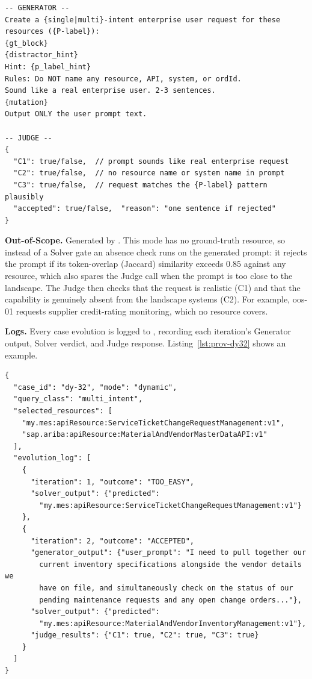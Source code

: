 \begin{lstlisting}[float=!t, floatplacement=!t, basicstyle=\ttfamily\scriptsize, breaklines=true, frame=single, label={lst:dy-prompts}, caption={DY Generator + Judge prompts.}]
-- GENERATOR --
Create a {single|multi}-intent enterprise user request for these resources ({P-label}):
{gt_block}
{distractor_hint}
Hint: {p_label_hint}
Rules: Do NOT name any resource, API, system, or ordId.
Sound like a real enterprise user. 2-3 sentences.
{mutation}
Output ONLY the user prompt text.

-- JUDGE --
{
  "C1": true/false,  // prompt sounds like real enterprise request
  "C2": true/false,  // no resource name or system name in prompt
  "C3": true/false,  // request matches the {P-label} pattern plausibly
  "accepted": true/false,  "reason": "one sentence if rejected"
}
\end{lstlisting}

\medskip\noindent\textbf{Out-of-Scope.} Generated by . This mode has no ground-truth resource, so instead of a Solver gate an absence check runs on the generated prompt: it rejects the prompt if its token-overlap (Jaccard) similarity exceeds $0.85$ against any resource, which also spares the Judge call when the prompt is too close to the landscape. The Judge then checks that the request is realistic (C1) and that the capability is genuinely absent from the landscape systems (C2). For example, oos-01 requests supplier credit-rating monitoring, which no resource covers.

\medskip\noindent\textbf{Logs.} Every case evolution is logged to , recording each iteration's Generator output, Solver verdict, and Judge response. Listing~\ref{lst:prov-dy32} shows an example.

\begin{lstlisting}[float=!t, floatplacement=!t, basicstyle=\ttfamily\scriptsize, breaklines=true, frame=single, label={lst:prov-dy32}, caption={Provenance log for dy-32 (multi-intent). The solver first recovers a ground-truth resource (too\_easy), so the prompt is regenerated until S is diverted to a sibling resource.}]
{
  "case_id": "dy-32", "mode": "dynamic",
  "query_class": "multi_intent",
  "selected_resources": [
    "my.mes:apiResource:ServiceTicketChangeRequestManagement:v1",
    "sap.ariba:apiResource:MaterialAndVendorMasterDataAPI:v1"
  ],
  "evolution_log": [
    {
      "iteration": 1, "outcome": "TOO_EASY",
      "solver_output": {"predicted":
        "my.mes:apiResource:ServiceTicketChangeRequestManagement:v1"}
    },
    {
      "iteration": 2, "outcome": "ACCEPTED",
      "generator_output": {"user_prompt": "I need to pull together our
        current inventory specifications alongside the vendor details we
        have on file, and simultaneously check on the status of our
        pending maintenance requests and any open change orders..."},
      "solver_output": {"predicted":
        "my.mes:apiResource:MaterialAndVendorInventoryManagement:v1"},
      "judge_results": {"C1": true, "C2": true, "C3": true}
    }
  ]
}
\end{lstlisting}

